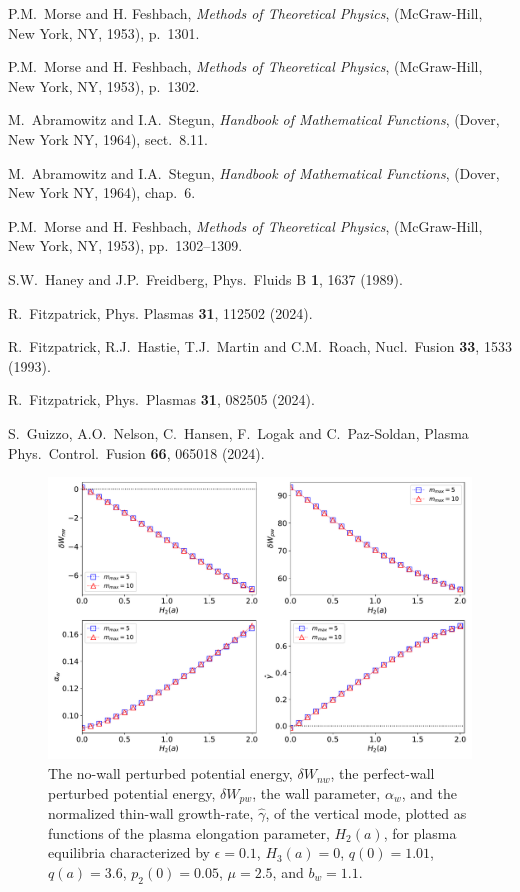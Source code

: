 \documentclass[12pt,prb,aps]{revtex4-1}
\begin{document}
\begin{thebibliography}{99}
 P.M.~Morse and H. Feshbach, {\em Methods of Theoretical Physics}, (McGraw-Hill, New York, NY, 1953), p.~1301.

 P.M.~Morse and H. Feshbach, {\em Methods of Theoretical Physics}, (McGraw-Hill, New York, NY, 1953), p.~1302.

 M.~Abramowitz and I.A.~Stegun, {\em Handbook of Mathematical Functions}, (Dover, New York NY, 1964), sect.~8.11.

 M.~Abramowitz and I.A.~Stegun, {\em Handbook of Mathematical Functions}, (Dover, New York NY, 1964), chap.~6.

 P.M.~Morse and H. Feshbach, {\em Methods of Theoretical Physics}, (McGraw-Hill, New York, NY, 1953), pp.~1302--1309.

 S.W.~Haney and J.P.~Freidberg, Phys.\ Fluids B {\bf 1}, 1637 (1989).

 R.~Fitzpatrick, Phys. Plasmas {\bf 31}, 112502 (2024).

 R.~Fitzpatrick, R.J.~Hastie, T.J.~Martin and C.M.~Roach, Nucl.\ Fusion {\bf 33}, 1533 (1993).

 R.~Fitzpatrick, Phys.\ Plasmas {\bf 31}, 082505 (2024).


 S.~Guizzo, A.O.~Nelson, C.~Hansen, F.~Logak and C.~Paz-Soldan, Plasma Phys.\ Control.\ Fusion {\bf 66},  065018  (2024).  

\end{thebibliography}

\newpage
\begin{figure}
\centerline{\includegraphics[width=\textwidth]{Fig1.pdf}}
\caption{The no-wall perturbed potential energy, $\delta W_{nw}$, the perfect-wall perturbed potential energy, $\delta W_{pw}$, the wall
parameter, $\alpha_w$, and the normalized thin-wall growth-rate, $\hat{\gamma}$,  of the  vertical mode, plotted as  functions of the
plasma elongation parameter, $H_2(a)$, for plasma equilibria characterized by  $\epsilon=0.1$, $H_3(a)=0$, $q(0)=1.01$, $q(a)=3.6$,  $p_2(0)=0.05$, $\mu=2.5$, and $b_w=1.1$. \label{fig1}}
\end{figure}
\end{document}
